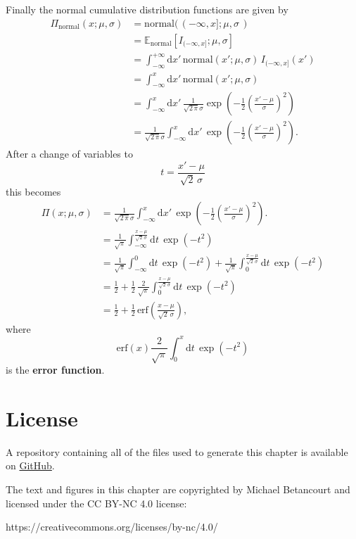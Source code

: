 \documentclass[
  letterpaper,
  DIV=11,
  numbers=noendperiod]{scrartcl}
\begin{document}
Finally the normal cumulative distribution functions are given by
\begin{align*}
\Pi_{\text{normal}}(x; \mu, \sigma)
&=
\text{normal}( \, (-\infty, x]; \mu, \sigma \, )
\\
&=
\mathbb{E}_{\mathrm{normal}}[ I_{(-\infty, x]}; \mu, \sigma ]
\\
&=
\int_{-\infty}^{+\infty} \mathrm{d} x' \,
\mathrm{normal}(x'; \mu, \sigma) \, I_{(-\infty, x]}(x')
\\
&=
\int_{-\infty}^{x} \mathrm{d} x' \,
\mathrm{normal}(x'; \mu, \sigma)
\\
&=
\int_{-\infty}^{x} \mathrm{d} x' \,
\frac{1}{\sqrt{2 \, \pi} \sigma}
\exp \left( -\frac{1}{2} \left( \frac{x' - \mu}{\sigma} \right)^{2} \right)
\\
&=
\frac{1}{\sqrt{2 \, \pi} \sigma}
\int_{-\infty}^{x} \mathrm{d} x' \,
\exp \left( -\frac{1}{2} \left( \frac{x' - \mu}{\sigma} \right)^{2} \right).
\end{align*} After a change of variables to \[
t = \frac{x' - \mu}{\sqrt{2} \, \sigma}
\] this becomes \begin{align*}
\Pi(x; \mu, \sigma)
&=
\frac{1}{\sqrt{2 \, \pi} \sigma}
\int_{-\infty}^{x} \mathrm{d} x' \,
\exp \left( -\frac{1}{2} \left( \frac{x' - \mu}{\sigma} \right)^{2} \right).
\\
&=
\frac{1}{\sqrt{\pi}}
\int_{-\infty}^{ \frac{x - \mu}{\sqrt{2} \, \sigma} } \mathrm{d} t \,
\exp \left( -t^{2} \right)
\\
&=
\frac{1}{\sqrt{\pi}}
\int_{-\infty}^{0} \mathrm{d} t \, \exp \left( -t^{2} \right)
+
\frac{1}{\sqrt{\pi}}
\int_{0}^{ \frac{x - \mu}{\sqrt{2} \, \sigma} } \mathrm{d} t \,
\exp \left( -t^{2} \right)
\\
&=
\frac{1}{2}
+
\frac{1}{2} \, \frac{2}{\sqrt{\pi}}
\int_{0}^{ \frac{x - \mu}{\sqrt{2} \, \sigma} } \mathrm{d} t \,
\exp \left( -t^{2} \right)
\\
&=
\frac{1}{2}
+
\frac{1}{2} \, \mathrm{erf} \left( \frac{x - \mu}{\sqrt{2} \, \sigma} \right),
\end{align*} where \[
\mathrm{erf} (x)
\frac{2}{\sqrt{\pi}}
\int_{0}^{ x } \mathrm{d} t \, \exp \left( -t^{2} \right)
\] is the \textbf{error function}.

\hypertarget{license}{%
\section*{License}\label{license}}

A repository containing all of the files used to generate this chapter
is available on
\href{https://github.com/betanalpha/quarto_chapters/tree/main/6_density_functions}{GitHub}.

The text and figures in this chapter are copyrighted by Michael
Betancourt and licensed under the CC BY-NC 4.0 license:

https://creativecommons.org/licenses/by-nc/4.0/
\end{document}
